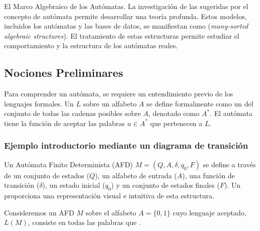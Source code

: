 \begin{anotacion}{El Marco Algebraico de los Autómatas.}
La investigación de las  sugeridas por el concepto de autómata permite desarrollar una teoría profunda. Estos modelos, incluidos los autómatas y las bases de datos, se manifiestan como  (\textit{many-sorted algebraic structures}). El tratamiento de estas estructuras permite estudiar el comportamiento y la estructura de los autómatas reales.
\end{anotacion}

\subsection{Nociones Preliminares}

Para comprender un autómata, se requiere un entendimiento previo de los lenguajes formales. Un  $L$ sobre un alfabeto $A$ se define formalmente como un  del conjunto de todas las cadenas posibles sobre $A$, denotado como $A^*$. El autómata tiene la función de aceptar las palabras $u \in A^*$ que pertenecen a $L$.

\subsubsection{Ejemplo introductorio mediante un diagrama de transición}

Un Autómata Finito Determinista (AFD) $M = (Q, A, \delta, q_0, F)$ se define a través de un conjunto de estados ($Q$), un alfabeto de entrada ($A$), una función de transición ($\delta$), un estado inicial ($q_0$) y un conjunto de estados finales ($F$). Un  proporciona una representación visual e intuitiva de esta estructura.

Consideremos un AFD $M$ sobre el alfabeto $A=\{0, 1\}$ cuyo lenguaje aceptado, $L(M)$, consiste en todas las palabras que .

